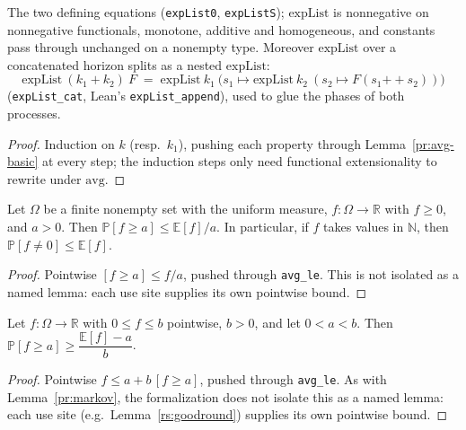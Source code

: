 \begin{lemma}
  \label{pr:expList-basic}
  \rocqok
  The two defining equations (\texttt{expList0}, \texttt{expListS});
  $\mathrm{expList}$ is nonnegative on nonnegative functionals, monotone,
  additive and homogeneous, and constants pass through unchanged on a
  nonempty type. Moreover $\mathrm{expList}$ over a concatenated horizon
  splits as a nested $\mathrm{expList}$:
  \[
    \mathrm{expList}\ (k_1 + k_2)\ F \;=\;
    \mathrm{expList}\ k_1\ \bigl(s_1 \mapsto
      \mathrm{expList}\ k_2\ (s_2 \mapsto F(s_1 \mathbin{+\!\!+} s_2))\bigr)
  \]
  (\texttt{expList\_cat}, Lean's \texttt{expList\_append}), used to glue the
  phases of both processes.
\end{lemma}
\begin{proof}
  \rocqok
  Induction on $k$ (resp.\ $k_1$), pushing each property through
  Lemma~\ref{pr:avg-basic} at every step; the induction steps only need
  functional extensionality to rewrite under $\mathrm{avg}$.
\end{proof}

\begin{lemma}\label{pr:markov}
  \rocqok
  Let $\Omega$ be a finite nonempty set with the uniform measure,
  $f \colon \Omega \to \mathbb{R}$ with $f \ge 0$, and $a > 0$. Then
  $\mathbb{P}[f \ge a] \le \mathbb{E}[f]/a$. In particular, if $f$ takes
  values in $\mathbb{N}$, then $\mathbb{P}[f \ne 0] \le \mathbb{E}[f]$.
\end{lemma}
\begin{proof}
  \rocqok
  Pointwise $[f \ge a] \le f/a$, pushed through \texttt{avg\_le}. This is not
  isolated as a named lemma: each use site supplies its own pointwise bound.
\end{proof}

\begin{lemma}\label{pr:revmarkov}
  \rocqok
  Let $f \colon \Omega \to \mathbb{R}$ with $0 \le f \le b$ pointwise, $b > 0$,
  and let $0 < a < b$. Then $\mathbb{P}[f \ge a] \ge
  \dfrac{\mathbb{E}[f] - a}{b}$.
\end{lemma}
\begin{proof}
  \rocqok
  Pointwise $f \le a + b\,[f \ge a]$, pushed through \texttt{avg\_le}. As
  with Lemma~\ref{pr:markov}, the formalization does not isolate this as a
  named lemma: each use site (e.g.\ Lemma~\ref{rs:goodround}) supplies its
  own pointwise bound.
\end{proof}

